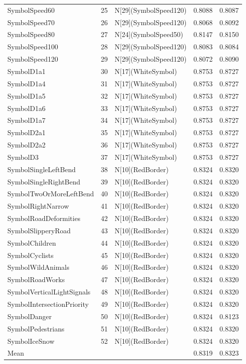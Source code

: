 \begin{tabular}{lllll}
SymbolSpeed60 & 25 & N[29](SymbolSpeed120) & 0.8088 & 0.8087 \\
SymbolSpeed70 & 26 & N[29](SymbolSpeed120) & 0.8068 & 0.8092 \\
SymbolSpeed80 & 27 & N[24](SymbolSpeed50) & 0.8147 & 0.8150 \\
SymbolSpeed100 & 28 & N[29](SymbolSpeed120) & 0.8083 & 0.8084 \\
SymbolSpeed120 & 29 & N[29](SymbolSpeed120) & 0.8072 & 0.8090 \\
SymbolD1a1 & 30 & N[17](WhiteSymbol) & 0.8753 & 0.8727 \\
SymbolD1a4 & 31 & N[17](WhiteSymbol) & 0.8753 & 0.8727 \\
SymbolD1a5 & 32 & N[17](WhiteSymbol) & 0.8753 & 0.8727 \\
SymbolD1a6 & 33 & N[17](WhiteSymbol) & 0.8753 & 0.8727 \\
SymbolD1a7 & 34 & N[17](WhiteSymbol) & 0.8753 & 0.8727 \\
SymbolD2a1 & 35 & N[17](WhiteSymbol) & 0.8753 & 0.8727 \\
SymbolD2a2 & 36 & N[17](WhiteSymbol) & 0.8753 & 0.8727 \\
SymbolD3 & 37 & N[17](WhiteSymbol) & 0.8753 & 0.8727 \\
SymbolSingleLeftBend & 38 & N[10](RedBorder) & 0.8324 & 0.8320 \\
SymbolSingleRightBend & 39 & N[10](RedBorder) & 0.8324 & 0.8320 \\
SymbolTwoOrMoreLeftBend & 40 & N[10](RedBorder) & 0.8324 & 0.8320 \\
SymbolRightNarrow & 41 & N[10](RedBorder) & 0.8324 & 0.8320 \\
SymbolRoadDeformities & 42 & N[10](RedBorder) & 0.8324 & 0.8320 \\
SymbolSlipperyRoad & 43 & N[10](RedBorder) & 0.8324 & 0.8320 \\
SymbolChildren & 44 & N[10](RedBorder) & 0.8324 & 0.8320 \\
SymbolCyclists & 45 & N[10](RedBorder) & 0.8324 & 0.8320 \\
SymbolWildAnimals & 46 & N[10](RedBorder) & 0.8324 & 0.8320 \\
SymbolRoadWorks & 47 & N[10](RedBorder) & 0.8324 & 0.8320 \\
SymbolVerticalLightSignals & 48 & N[10](RedBorder) & 0.8324 & 0.8320 \\
SymbolIntersectionPriority & 49 & N[10](RedBorder) & 0.8324 & 0.8320 \\
SymbolDanger & 50 & N[10](RedBorder) & 0.8324 & 0.8123 \\
SymbolPedestrians & 51 & N[10](RedBorder) & 0.8324 & 0.8320 \\
SymbolIceSnow & 52 & N[10](RedBorder) & 0.8324 & 0.8320 \\
Mean &  &  & 0.8319 & 0.8323 \\
\bottomrule
\end{tabular}
